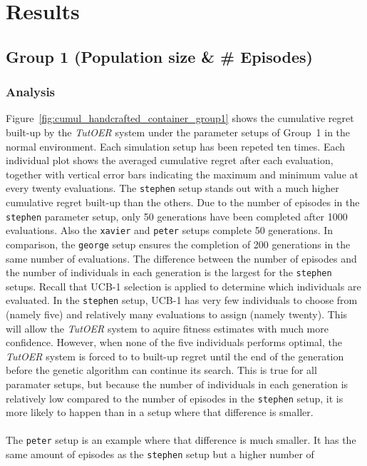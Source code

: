 \section{Results}
\label{sec:simulations_results}
\subsection{Group 1 (Population size \& \# Episodes)}
\subsubsection*{Analysis}
Figure~\ref{fig:cumul_handcrafted_container_group1} shows the cumulative
regret built-up by the \emph{TutOER} system under the parameter setups of Group~1
in the normal environment. Each simulation setup has
been repeted ten times. Each individual plot shows the averaged cumulative
regret after each evaluation, together with vertical error bars indicating the
maximum and minimum value at every twenty evaluations. The \texttt{stephen} setup stands out with a
much higher cumulative regret built-up than the others. Due to the number of episodes in the
\texttt{stephen} parameter setup, only 50 generations have been completed after
1000 evaluations. Also the \texttt{xavier} and \texttt{peter} setups complete
50 generations. In comparison, the \texttt{george} setup ensures the completion
of 200 generations in the same number of evaluations. The difference between
the number of episodes and the number of individuals in each generation is the
largest for the \texttt{stephen} setups. Recall that UCB-1 selection is applied
to determine which individuals are evaluated. In the \texttt{stephen} setup,
UCB-1 has very few individuals to choose from (namely five) and relatively many
evaluations to assign (namely twenty). This will allow the \emph{TutOER} system
to aquire fitness estimates with much more confidence. However, when none of
the five individuals performs optimal, the \emph{TutOER} system is forced to
to built-up regret until the end of the generation before the genetic algorithm
can continue its search. This is true for all paramater setups, but
because the number of individuals in each generation is relatively low compared
to the number of episodes in the \texttt{stephen} setup, it is more likely to
happen than in a setup where that difference is smaller.\\\\
\noindent
The \texttt{peter}
setup is an example where that difference is much smaller. It has the same
amount of episodes as the \texttt{stephen} setup but a higher number of
